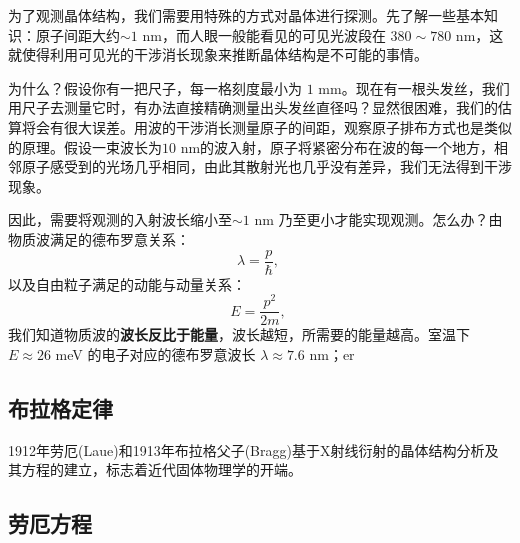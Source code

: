 
为了观测晶体结构，我们需要用特殊的方式对晶体进行探测。先了解一些基本知识：原子间距大约$\sim 1$ nm，而人眼一般能看见的可见光波段在 $380 \sim 780 $ nm，这就使得利用可见光的干涉消长现象来推断晶体结构是不可能的事情。

为什么？假设你有一把尺子，每一格刻度最小为 $1$ mm。现在有一根头发丝，我们用尺子去测量它时，有办法直接精确测量出头发丝直径吗？显然很困难，我们的估算将会有很大误差。用波的干涉消长测量原子的间距，观察原子排布方式也是类似的原理。假设一束波长为$10$ nm的波入射，原子将紧密分布在波的每一个地方，相邻原子感受到的光场几乎相同，由此其散射光也几乎没有差异，我们无法得到干涉现象。

因此，需要将观测的入射波长缩小至$\sim 1$ nm 乃至更小才能实现观测。怎么办？由物质波满足的德布罗意关系：
\begin{equation}
\lambda = \dfrac{p}{\hbar},~
\end{equation}
以及自由粒子满足的动能与动量关系：
\begin{equation}
E = \dfrac{p^2}{2 m},~
\end{equation}
我们知道物质波的\textbf{波长反比于能量}，波长越短，所需要的能量越高。室温下 $E \approx 26 $ meV 的电子对应的德布罗意波长 $\lambda \approx  7.6 $ nm；er

\subsection{布拉格定律}
1912年劳厄(Laue)和1913年布拉格父子(Bragg)基于X射线衍射的晶体结构分析及其方程的建立，标志着近代固体物理学的开端。


\subsection{劳厄方程}